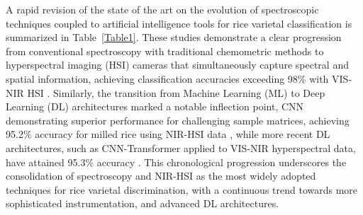 \documentclass[final,5p,times,twocolumn]{elsarticle}
\begin{document}

A rapid revision of the state of the art on the evolution of spectroscopic techniques coupled to artificial intelligence tools for rice varietal classification is summarized in Table~\ref{Table1}. 
These studies demonstrate a clear progression from conventional spectroscopy with traditional chemometric methods \cite{Shi2022, Tong2021} to hyperspectral imaging (HSI) cameras that simultaneously capture spectral and spatial information, achieving classification accuracies exceeding 98\% with VIS-NIR HSI \cite{Weng2020}. 
Similarly, the transition from Machine Learning (ML) to Deep Learning (DL) architectures marked a notable inflection point, CNN demonstrating superior performance for challenging sample matrices, achieving 95.2\% accuracy for milled rice using NIR-HSI data \cite{Onmarkhong2022}, while more recent DL architectures, such as CNN-Transformer applied to VIS-NIR hyperspectral data, have attained 95.3\% accuracy \cite{Zhang2025}. 
This chronological progression underscores the consolidation of spectroscopy and NIR-HSI as the most widely adopted techniques for rice varietal discrimination, with a continuous trend towards more sophisticated instrumentation, and advanced DL architectures.
\end{document}
